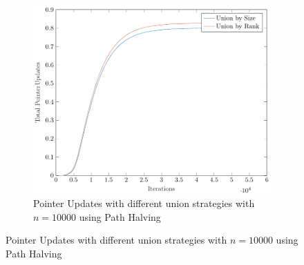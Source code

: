 \begin{figure}[ht]
\begin{subfigure}{0.32\textwidth}
    \end{subfigure}%
    \hfill
    \begin{subfigure}{0.32\textwidth}
        \centering
        \includegraphics[width=\textwidth]{../images/plotPHNonFull10000_PointerUpdates.pdf}
        \caption{Pointer Updates with different union strategies with $n = 10000$ using Path Halving}
    \end{subfigure}


\end{figure}
